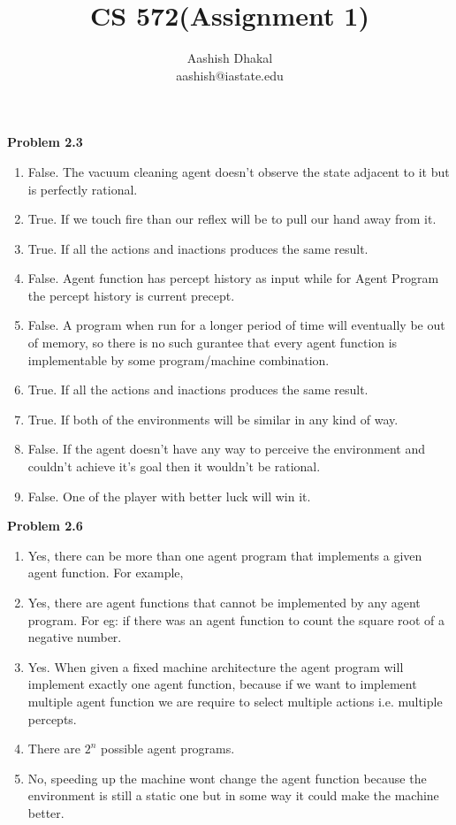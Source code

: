 \documentclass[11pt]{article}
\begin{document}
\title{CS 572(Assignment 1)} %
\author{Aashish Dhakal\\ %
aashish@iastate.edu\\%
 }      %
\date{}


\maketitle
\section*{}

\textbf{Problem 2.3}
\begin{enumerate}[label=(\alph*)]
  \item False. The vacuum cleaning agent doesn't observe the state adjacent to it but is perfectly rational.
  \item True. If we touch fire than our reflex will be to pull our hand away from it.
  \item True. If all the actions and inactions produces the same result.
  \item False. Agent function has percept history as input while for Agent Program the percept history is current precept.
  \item False. A program when run for a longer period of time will eventually be out of memory, so there is no such gurantee that every agent function is
  implementable by some program/machine combination.
  \item True. If all the actions and inactions produces the same result.
  \item True. If both of the environments will be similar in any kind of way.
  \item False. If the agent doesn't have any way to perceive the environment and couldn't achieve it's goal then it wouldn't be rational.
  \item False. One of the player with better luck will win it.
\end{enumerate}

\textbf{Problem 2.6}
\begin{enumerate}[label=(\alph*)]
  \item Yes, there can be more than one agent program that implements a given agent function. For example,
  \item Yes, there are agent functions that cannot be implemented by any agent program. For eg: if there was an agent function to count the square root of a
  negative number.
  \item Yes. When given a fixed machine architecture the agent program will implement exactly one agent function, because if we want to implement multiple
  agent function we are require to select multiple actions i.e. multiple percepts. 
  \item There are $2^n$ possible agent programs.
  \item No, speeding up the machine wont change the agent function because the environment is still a static one but in some way it could make the machine
  better.
\end{enumerate}
\end{document}
